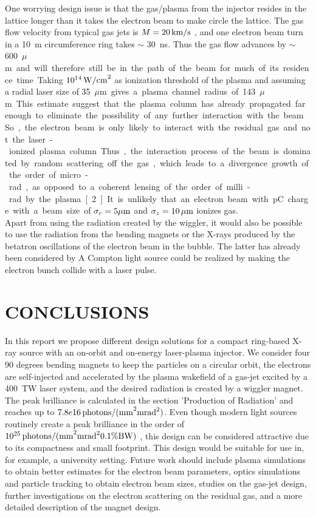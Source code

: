 \documentclass[a4paper,
              ]{jacow}
\begin{document}
One worrying design issue is that the gas/plasma from the injector resides in the lattice longer than it takes the electron beam to make circle the lattice. The gas flow velocity from typical gas jets is $M = 20\,\rm{km/s}$ \cite{GASFLOW}, and one electron beam turn in a \SI{10}{m} circumference ring takes $\sim$ \SI{30}{ns}.  Thus the gas flow advances by $\sim$\SI{600}{$\mu$m} and will therefore still be in the path of the beam for much of its residence time. Taking $10^{14}\,\rm{W/cm}^2$ as ionization threshold of the plasma and assuming a radial laser size of \SI{35}{$\mu$m} gives a plasma channel radius of \SI{143} {$\mu$m}. This estimate suggest that the plasma column has already propagated far enough to eliminate the possibility of any further interaction with the beam. So, the electron beam is only likely to interact with the residual gas and not the laser-ionized plasma column. Thus, the interaction process of the beam is dominated by random scattering off the gas, which leads to a divergence growth of the order of micro-rad, as opposed to a coherent lensing of the order of milli-rad by the plasma [2]. It is unlikely that an electron beam with pC charge with a beam size of $\sigma_r = 5\mu\rm{m}$ and $\sigma_z = 10\,\mu\rm{m}$ ionizes gas.\\
Apart from using the radiation created by the wiggler, it would also be possible to use the radiation from the bending magnets or the X-rays produced by the betatron oscillations of the electron beam in the bubble. The latter has already been considered by \cite{PRODKEVS}
A Compton light source could be realized by making the electron bunch collide with a laser pulse.
\section{CONCLUSIONS}

In this report we propose different design solutions for a compact ring-based X-ray source with an on-orbit and on-energy laser-plasma injector. We consider four 90 degrees bending magnets to keep the particles on a circular orbit, the electrons are self-injected and accelerated by the plasma wakefield of a gas-jet excited by a \SI{400}{TW} laser system, and the desired radiation is created by a wiggler magnet. The peak brilliance is calculated in the section 'Production of Radiation' and reaches up to $7.8e16\,\rm{photons/(mm}^2 \rm{mrad}^2)$. Even though modern light sources routinely create a peak brilliance in the order of $10^{25}\,\rm{photons/(mm}^2 \rm{mrad}^2 0.1\%\rm{BW})$ \cite{DESY}, this design can be considered attractive due to its compactness and small footprint. This design would be suitable for use in, for example, a university setting.
Future work should include plasma simulations to obtain better estimates for the electron beam parameters, optics simulations and particle tracking to obtain electron beam sizes, studies on the gas-jet design, further investigations on the electron scattering on the residual gas, and a more detailed description of the magnet design.   
\end{document}
